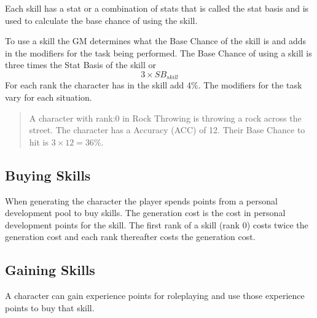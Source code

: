 Each skill has a stat or a combination of stats that is called the 
stat basis and is used to calculate the base chance of using the 
skill. 

To use a skill the GM determines what the Base Chance of the skill is 
and adds in the modifiers for the task being performed.
The Base Chance of using a skill is three times the Stat Basis of the skill
or \[ 3 \times SB_{skill} \] For each rank the character has in the skill add 4\%.
The modifiers for the task vary for each situation.

\begin{quote}
A character with rank:0 in Rock Throwing is throwing a rock 
across the street. The character has a Accuracy (ACC) of 12. Their Base Chance 
to hit is \( 3 \times 12 = 36\% \).
\end{quote}

\subsection{Buying Skills}

When generating the character the player spends points from a
personal development pool to buy skills. The generation cost is the 
cost in personal development points for the skill. The first rank of 
a skill (rank 0) costs twice the generation cost and each rank 
thereafter costs the generation cost. 

\subsection{Gaining Skills}

A character can gain experience points for roleplaying and use those 
experience points to buy that skill. 

